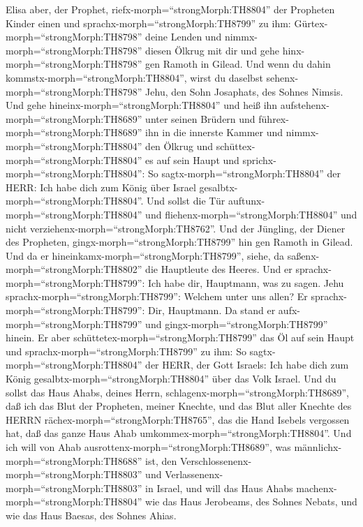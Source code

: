  Elisa aber, der Prophet, riefx-morph=``strongMorph:TH8804''
der Propheten Kinder einen und sprachx-morph=``strongMorph:TH8799'' zu
ihm: Gürtex-morph=``strongMorph:TH8798'' deine Lenden und
nimmx-morph=``strongMorph:TH8798'' diesen Ölkrug mit dir und gehe
hinx-morph=``strongMorph:TH8798'' gen Ramoth in Gilead.  Und
wenn du dahin kommstx-morph=``strongMorph:TH8804'', wirst du daselbst
sehenx-morph=``strongMorph:TH8798'' Jehu, den Sohn Josaphats, des Sohnes
Nimsis. Und gehe hineinx-morph=``strongMorph:TH8804'' und heiß ihn
aufstehenx-morph=``strongMorph:TH8689'' unter seinen Brüdern und
führex-morph=``strongMorph:TH8689'' ihn in die innerste Kammer
 und nimmx-morph=``strongMorph:TH8804'' den Ölkrug und
schüttex-morph=``strongMorph:TH8804'' es auf sein Haupt und
sprichx-morph=``strongMorph:TH8804'': So
sagtx-morph=``strongMorph:TH8804'' der HERR: Ich habe dich zum König
über Israel gesalbtx-morph=``strongMorph:TH8804''. Und sollst die Tür
auftunx-morph=``strongMorph:TH8804'' und
fliehenx-morph=``strongMorph:TH8804'' und nicht
verziehenx-morph=``strongMorph:TH8762''.  Und der Jüngling,
der Diener des Propheten, gingx-morph=``strongMorph:TH8799'' hin gen
Ramoth in Gilead.  Und da er
hineinkamx-morph=``strongMorph:TH8799'', siehe, da
saßenx-morph=``strongMorph:TH8802'' die Hauptleute des Heeres. Und er
sprachx-morph=``strongMorph:TH8799'': Ich habe dir, Hauptmann, was zu
sagen. Jehu sprachx-morph=``strongMorph:TH8799'': Welchem unter uns
allen? Er sprachx-morph=``strongMorph:TH8799'': Dir, Hauptmann.
 Da stand er aufx-morph=``strongMorph:TH8799'' und
gingx-morph=``strongMorph:TH8799'' hinein. Er aber
schüttetex-morph=``strongMorph:TH8799'' das Öl auf sein Haupt und
sprachx-morph=``strongMorph:TH8799'' zu ihm: So
sagtx-morph=``strongMorph:TH8804'' der HERR, der Gott Israels: Ich habe
dich zum König gesalbtx-morph=``strongMorph:TH8804'' über das Volk
Israel.  Und du sollst das Haus Ahabs, deines Herrn,
schlagenx-morph=``strongMorph:TH8689'', daß ich das Blut der Propheten,
meiner Knechte, und das Blut aller Knechte des HERRN
rächex-morph=``strongMorph:TH8765'', das die Hand Isebels vergossen hat,
 daß das ganze Haus Ahab
umkommex-morph=``strongMorph:TH8804''. Und ich will von Ahab
ausrottenx-morph=``strongMorph:TH8689'', was
männlichx-morph=``strongMorph:TH8688'' ist, den
Verschlossenenx-morph=``strongMorph:TH8803'' und
Verlassenenx-morph=``strongMorph:TH8803'' in Israel,  und
will das Haus Ahabs machenx-morph=``strongMorph:TH8804'' wie das Haus
Jerobeams, des Sohnes Nebats, und wie das Haus Baesas, des Sohnes Ahias.
